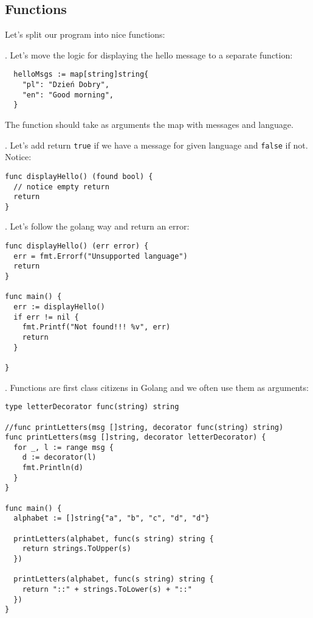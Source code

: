 \documentclass[11pt, letterpaper]{article}
\begin{document}
\subsection{Functions}

Let's split our program into nice functions:

. Let's move the logic for displaying the hello message to a separate function:

\begin{verbatim}
  helloMsgs := map[string]string{
    "pl": "Dzień Dobry",
    "en": "Good morning",
  }
\end{verbatim}

The function should take as arguments the map with messages and language.

. Let's add return \verb|true| if we have a message for given language and \verb|false| if not. Notice:

\begin{verbatim}
func displayHello() (found bool) {
  // notice empty return
  return
}
\end{verbatim}

. Let's follow the golang way and return an error:

\begin{verbatim}
func displayHello() (err error) {
  err = fmt.Errorf("Unsupported language")
  return
}

func main() {
  err := displayHello()
  if err != nil {
    fmt.Printf("Not found!!! %v", err)
    return
  }

}
\end{verbatim}

. Functions are first class citizens in Golang and we often use them as arguments:

\begin{verbatim}
type letterDecorator func(string) string

//func printLetters(msg []string, decorator func(string) string)
func printLetters(msg []string, decorator letterDecorator) {
  for _, l := range msg {
    d := decorator(l)
    fmt.Println(d)
  }
}

func main() {
  alphabet := []string{"a", "b", "c", "d", "d"}

  printLetters(alphabet, func(s string) string {
    return strings.ToUpper(s)
  })

  printLetters(alphabet, func(s string) string {
    return "::" + strings.ToLower(s) + "::"
  })
}
\end{verbatim}
\end{document}
